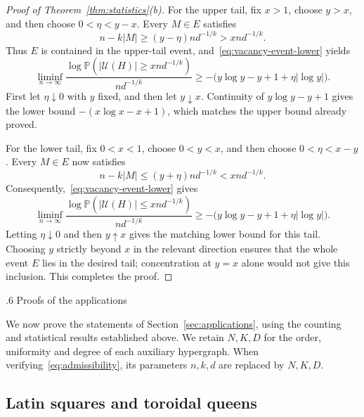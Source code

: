 \documentclass[11pt,reqno]{amsart}
\makeatletter
\numberwithin{equation}{section}
\renewcommand{\section}{\@startsection{section}{1}%
    \z@{1.3\linespacing\@plus.5\linespacing\@minus.2\linespacing}%
    {.6\linespacing}%
    {\normalfont\scshape\centering}}
\theoremstyle{plain}
\theoremstyle{definition}
\newcommand{\Prob}{\mathbb P}
\newcommand{\calU}{\mathcal U}
\makeatother
\begin{document}
\begin{proof}[Proof of Theorem~\ref{thm:statistics}(b)]
    For the upper tail, fix $x>1$, choose $y>x$, and then choose $0<\eta<y-x$.
    Every $M\in E$ satisfies
    \[
        n-k|M|\ge(y-\eta)nd^{-1/k}>xnd^{-1/k}.
    \]
    Thus $E$ is contained in the upper-tail event, and~\eqref{eq:vacancy-event-lower} yields
    \[
        \liminf_{n\to\infty}
        \frac{\log\Prob(|\calU(H)|\ge xnd^{-1/k})}{nd^{-1/k}}
        \ge-\bigl(y\log y-y+1+\eta|\log y|\bigr).
    \]
    First let $\eta\downarrow0$ with $y$ fixed, and then let $y\downarrow x$.
    Continuity of $y\log y-y+1$ gives the lower bound $-(x\log x-x+1)$, which matches the upper bound already proved.

    For the lower tail, fix $0<x<1$, choose $0<y<x$, and then choose $0<\eta<x-y$.
    Every $M\in E$ now satisfies
    \[
        n-k|M|\le(y+\eta)nd^{-1/k}<xnd^{-1/k}.
    \]
    Consequently,~\eqref{eq:vacancy-event-lower} gives
    \[
        \liminf_{n\to\infty}
        \frac{\log\Prob(|\calU(H)|\le xnd^{-1/k})}{nd^{-1/k}}
        \ge-\bigl(y\log y-y+1+\eta|\log y|\bigr).
    \]
    Letting $\eta\downarrow0$ and then $y\uparrow x$ gives the matching lower bound for this tail.
    Choosing $y$ strictly beyond $x$ in the relevant direction ensures that the whole event $E$ lies in the desired tail; concentration at $y=x$ alone would not give this inclusion.
    This completes the proof.
\end{proof}


\section{Proofs of the applications}\label{sec:applicationproofs}

We now prove the statements of Section~\ref{sec:applications}, using the counting and statistical results established above.
We retain $N,K,D$ for the order, uniformity and degree of each auxiliary hypergraph. When verifying~\eqref{eq:admissibility}, its parameters $n,k,d$ are replaced by $N,K,D$.

\subsection{Latin squares and toroidal queens}\label{subsec:latinqueensproofs}
\end{document}
